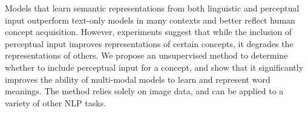 Models that learn semantic representations from both linguistic and perceptual input outperform text-only models in many contexts and better reflect human concept acquisition. However, experiments suggest that while the inclusion of perceptual input improves representations of certain concepts, it degrades the representations of others. We propose an unsupervised method to determine whether to include perceptual input for a concept, and show that it significantly improves the ability of multi-modal models to learn and represent word meanings. The method relies solely on image data, and can be applied to a variety of other NLP tasks.
